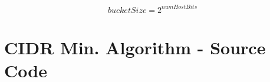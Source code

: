 \begin{appendices}
\begin{equation}\label{eq:bucketSizeHostBits}
bucketSize = 2^{numHostBits}
\end{equation}

\vfill





\chapter{CIDR Min. Algorithm - Source Code}
\label{appendix:cidrMinSource}

\end{appendices}